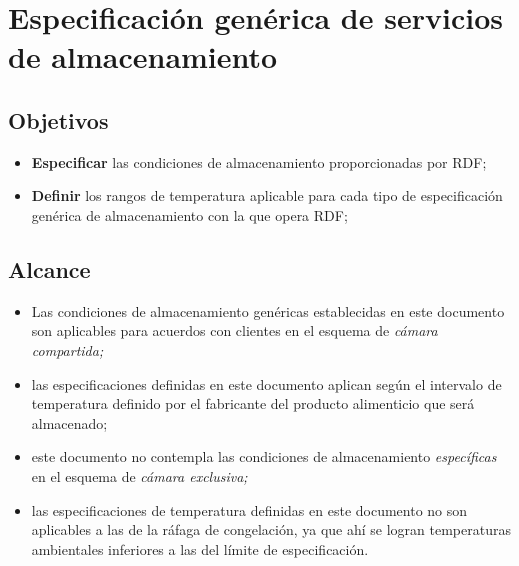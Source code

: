 \thispagestyle{formato-PI}
\renewcommand{\MayorVer}{2}
\renewcommand{\MenorVer}{0}
\renewcommand{\Codigo}{PSA-9-ESP} %
\renewcommand{\FechaPub}{2023--01}
\renewcommand{\Titulo}{Especificación genérica de servicios de almacenamiento}

\section{\Titulo}\label{esp:generica}

\subsection{Objetivos}

\begin{itemize}
	\item \textbf{Especificar} las condiciones de almacenamiento proporcionadas por \gls{RDF};
	\item \textbf{Definir} los rangos de temperatura aplicable para cada tipo de especificación genérica de almacenamiento con la que opera \gls{RDF};
\end{itemize}

\subsection{Alcance}

\begin{itemize}
	\item Las condiciones de almacenamiento genéricas establecidas en este documento son aplicables para acuerdos con clientes en el esquema de \emph{cámara compartida;}
	\item las especificaciones definidas en este documento aplican según el intervalo de temperatura definido por el fabricante del producto alimenticio que será almacenado;
	\item este documento no contempla las condiciones de almacenamiento \emph{específicas} en el esquema de \emph{cámara exclusiva;}
	\item las especificaciones de temperatura definidas en este documento no son aplicables a las de la ráfaga de congelación, ya que ahí se logran temperaturas ambientales inferiores a las del límite de especificación.
\end{itemize}

